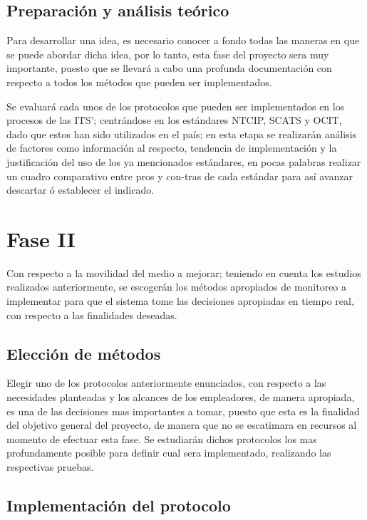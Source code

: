 \subsection{Preparación y análisis teórico}

Para desarrollar una idea, es necesario conocer a fondo todas las maneras en que se puede abordar dicha idea, por lo tanto, esta fase del proyecto sera muy importante, puesto que se llevará a cabo una profunda documentación con respecto a todos los métodos que pueden ser implementados.

Se evaluará cada unos de los protocolos que pueden ser implementados en los procesos de las ITS'; centrándose en los estándares NTCIP, SCATS y OCIT, dado que estos han sido utilizados en el país; en esta etapa se realizarán análisis de factores como información al respecto, tendencia de implementación y la justificación del uso de los ya mencionados estándares, en pocas palabras realizar un cuadro comparativo entre pros y con-tras de cada estándar para así avanzar descartar ó establecer el indicado.
    
\section {Fase II}

Con respecto a la movilidad del medio a mejorar; teniendo en cuenta los estudios realizados anteriormente, se escogerán los métodos apropiados de monitoreo a implementar para que el sistema tome las decisiones apropiadas en tiempo real, con respecto a las finalidades deseadas.

\subsection{Elección de métodos}

Elegir uno de los protocolos anteriormente enunciados, con respecto a las necesidades planteadas y los alcances de los empleadores, de manera apropiada, es una de las decisiones mas importantes a tomar, puesto que esta es la finalidad del objetivo general del proyecto, de manera que no se escatimara en recursos al momento de efectuar esta fase. Se estudiarán dichos protocolos los mas profundamente posible para definir cual sera implementado, realizando las respectivas pruebas.


\subsection{Implementación del protocolo}

